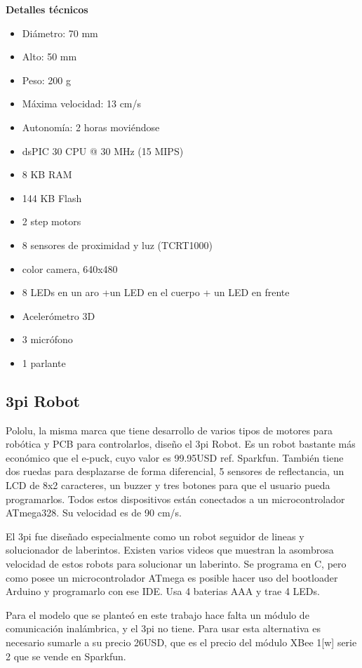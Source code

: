 \textbf{Detalles técnicos}
\begin{itemize}
\item Diámetro: 70 mm
\item Alto: 50 mm
\item Peso: 200 g
\item Máxima velocidad: 13 cm/s
\item Autonomía: 2 horas moviéndose
\item dsPIC 30 CPU @ 30 MHz (15 MIPS)
\item 8 KB RAM
\item 144 KB Flash
\item 2 step motors
\item 8 sensores de proximidad y luz (TCRT1000)
\item color camera, 640x480
\item 8 LEDs en un aro +un LED en el cuerpo + un LED en frente
\item Acelerómetro 3D
\item 3 micrófono
\item 1 parlante
\end{itemize}


\subsection{3pi Robot}

Pololu, la misma marca que tiene desarrollo de varios tipos de motores para robótica y PCB para controlarlos, diseño el 3pi Robot. Es un robot bastante más económico que el e-puck, cuyo valor es 99.95USD ref. Sparkfun. También tiene dos ruedas para desplazarse de forma diferencial, 5 sensores de reflectancia, un LCD de 8x2 caracteres, un buzzer y tres botones para que el usuario pueda programarlos. Todos estos dispositivos están conectados a un microcontrolador ATmega328. Su velocidad es de 90 cm/s.

El 3pi fue diseñado especialmente como un robot seguidor de lineas y solucionador de laberintos. Existen varios videos que muestran la asombrosa velocidad de estos robots para solucionar un laberinto. Se programa en C, pero como posee un microcontrolador ATmega es posible hacer uso del bootloader Arduino y programarlo con ese IDE. Usa 4 baterias AAA y trae 4 LEDs.

Para el modelo que se planteó en este trabajo hace falta un módulo de comunicación inalámbrica, y el 3pi no tiene. Para usar esta alternativa es necesario sumarle a su precio 26USD, que es el precio del módulo XBee 1[w] serie 2 que se vende en Sparkfun.

